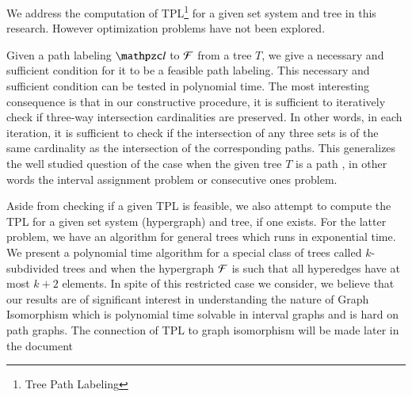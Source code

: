 \documentclass[MS,synopsis]{iitmdiss}
\begin{document}
We address the computation of TPL\footnote{Tree Path Labeling} for a
given set system and tree in this research. However optimization
problems have not been explored.

Given a path labeling $\cl$ to ${\cal F}$ from a tree $T$, we give a
necessary and sufficient condition for it to be a feasible path
labeling.  This necessary and sufficient condition can be tested in
polynomial time.  The most interesting consequence is that in our
constructive procedure, it is sufficient to iteratively check if
three-way intersection cardinalities are preserved.  In other words,
in each iteration, it is sufficient to check if the intersection of
any three sets is of the same cardinality as the intersection of the
corresponding paths.  This generalizes the well studied question of
the case when the given tree $T$ is a path \cite{wlh02,nsnrs09}, in
other words the interval assignment problem or consecutive ones problem.

Aside from checking if a given TPL is feasible, we also attempt to
compute the TPL for a given set system (hypergraph) and tree, if one
exists. For the latter problem, we have an algorithm for general trees
which runs in exponential time. We present a polynomial time
algorithm for a special class of trees called $k$-subdivided trees and
when the hypergraph ${\cal F}$ is such that all hyperedges have at most
$k+2$ elements.  In spite of this restricted case we consider, we
believe that our results are of significant interest in understanding
the nature of Graph Isomorphism which is polynomial time solvable in
interval graphs and is hard on path graphs. The connection of TPL to graph
isomorphism will be made later in the document



\end{document}
